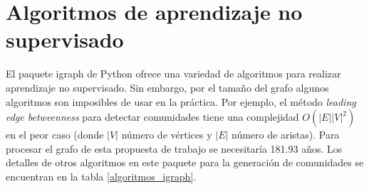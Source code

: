 \section{Algoritmos de aprendizaje no supervisado}
El paquete igraph\cite{igraph} de Python ofrece una variedad de algoritmos para realizar aprendizaje no supervisado. Sin embargo, por el tamaño del grafo algunos algoritmos son imposibles de usar en la práctica. Por ejemplo, el método \textit{leading edge betweenness} para detectar comunidades tiene una complejidad $O(|E||V|^2)$ en el peor caso (donde $|V|$ número de vértices y $|E|$ número de aristas). Para procesar el grafo de esta propuesta de trabajo se necesitaría 181.93 años. Los detalles de otros algoritmos en este paquete para la generación de comunidades se encuentran en la tabla \ref{algoritmos_igraph}.

